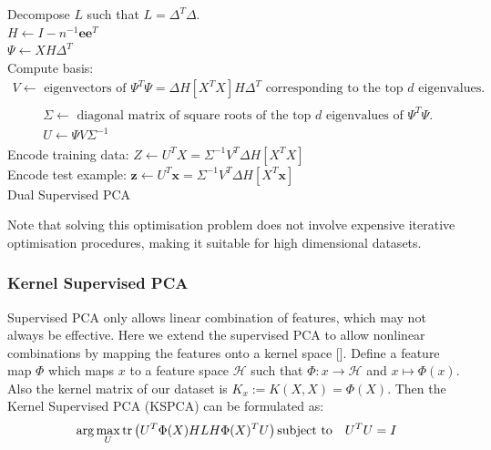 \documentclass[a4paper,12pt]{article}
\begin{document}
\begin{algorithm}[H]
\SetAlgoLined
 Decompose $L$ such that $L=\Delta^{T} \Delta$.\\
 $H \leftarrow I-n^{-1} \mathbf{e e}^{T}$\\
 $\Psi \leftarrow X H \Delta^{T}$\\
 Compute basis:
 $\begin{array}{l}
 V \leftarrow \text { eigenvectors of } \Psi^{T} \Psi=\Delta H\left[X^{T} X\right] H \Delta^{T} \text { corresponding to the top } d \text { eigenvalues. } \\ 
 \qquad \begin{array}{l}\Sigma \leftarrow \text { diagonal matrix of square roots of the top } d \text { eigenvalues of } \Psi^{T} \Psi . \\ 
U \leftarrow \Psi V \Sigma^{-1}\end{array}\end{array}$\\
 Encode training data: $Z \leftarrow U^{T} X=\Sigma^{-1} V^{T} \Delta H\left[X^{T} X\right]$\\
 Encode test example: $\mathbf{z} \leftarrow U^{T} \mathbf{x}=\Sigma^{-1} V^{T} \Delta H\left[X^{T} \mathbf{x}\right]$\\
\caption{Dual Supervised PCA}
\end{algorithm}
Note that solving this optimisation problem does not involve expensive iterative optimisation procedures, making it suitable for high dimensional datasets.

\subsubsection{Kernel Supervised PCA}
Supervised PCA only allows linear combination of features, which may not always be effective. Here we extend the supervised PCA to allow nonlinear combinations by mapping the features onto a kernel space [\cite{ghojogh2019unsupervised}]. Define a feature map $\Phi$ which maps $x$ to a feature space $\mathcal{H}$ such that $\Phi: x \rightarrow \mathcal{H} $ and $x \mapsto \Phi(x)$. Also the kernel matrix of our dataset is $ {K}_{x}:= {K}( {X},  {X})= {\Phi}( {X})$. Then the Kernel Supervised PCA (KSPCA) can be formulated as:
\begin{equation*}
\arg \max _{U} \operatorname{tr}\left(U^{T} \Phi(X) H L H \Phi(X)^{T} U\right) \\
\text {subject to} \quad U^{T} U=I
\end{equation*}
\end{document}
